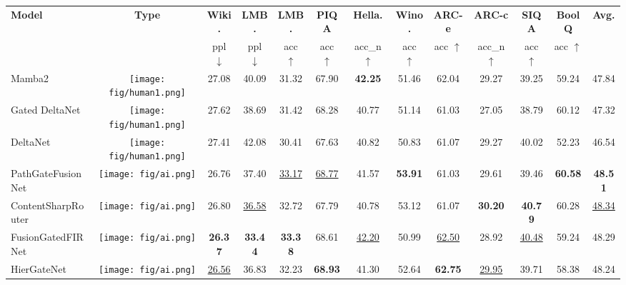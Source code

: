 \begin{table*}[t!]
    \vspace{0mm}
    \centering
    \footnotesize
    \addtolength{\tabcolsep}{-2.5pt}    
    \begin{tabular}{l|c|cc|ccccccccc}
\toprule
\textbf{Model} & \textbf{Type} & \textbf{Wiki.}  &  \textbf{LMB.} &  \textbf{LMB.} & \textbf{PIQA} &    \textbf{Hella.} & \textbf{Wino.} & \textbf{ARC-e} &  \textbf{ARC-c} &  \textbf{SIQA}  & \textbf{BoolQ} &  \textbf{Avg.} \\
 & & ppl $\downarrow$  &  ppl $\downarrow$  &  acc $\uparrow$  & acc $\uparrow$ &   acc\_n $\uparrow$  & acc $\uparrow$  & acc $\uparrow$ & acc\_n $\uparrow$ &  acc $\uparrow$  & acc $\uparrow$ &     \\
    \midrule
    \midrule
    \hspace{2mm} Mamba2 & \texttt{[image: fig/human1.png]} & 27.08 & 40.09 & 31.32 & 67.90 & \textbf{42.25} & 51.46 & 62.04 & 29.27 & 39.25 & 59.24 & 47.84 \\
\hspace{2mm} Gated DeltaNet & \texttt{[image: fig/human1.png]} & 27.62 & 38.69 & 31.42 & 68.28 & 40.77 & 51.14 & 61.03 & 27.05 & 38.79 & 60.12 & 47.32 \\
\hspace{2mm} DeltaNet & \texttt{[image: fig/human1.png]} & 27.41 & 42.08 & 30.41 & 67.63 & 40.82 & 50.83 & 61.07 & 29.27 & 40.02 & 52.23 & 46.54 \\
\midrule
\hspace{2mm} PathGateFusionNet & \texttt{[image: fig/ai.png]} & 26.76 & 37.40 & \underline{33.17} & \underline{68.77} & 41.57 & \textbf{53.91} & 61.03 & 29.61 & 39.46 & \textbf{60.58} & \textbf{48.51} \\
\hspace{2mm} ContentSharpRouter & \texttt{[image: fig/ai.png]} & 26.80 & \underline{36.58} & 32.72 & 67.79 & 40.78 & 53.12 & 61.07 & \textbf{30.20} & \textbf{40.79} & 60.28 & \underline{48.34} \\
\hspace{2mm} FusionGatedFIRNet & \texttt{[image: fig/ai.png]} & \textbf{26.37} & \textbf{33.44} & \textbf{33.38} & 68.61 & \underline{42.20} & 50.99 & \underline{62.50} & 28.92 & \underline{40.48} & 59.24 & 48.29 \\
\hspace{2mm} HierGateNet & \texttt{[image: fig/ai.png]} & \underline{26.56} & 36.83 & 32.23 & \textbf{68.93} & 41.30 & 52.64 & \textbf{62.75} & \underline{29.95} & 39.71 & 58.38 & 48.24 \\

\end{tabular}
\end{table*}
